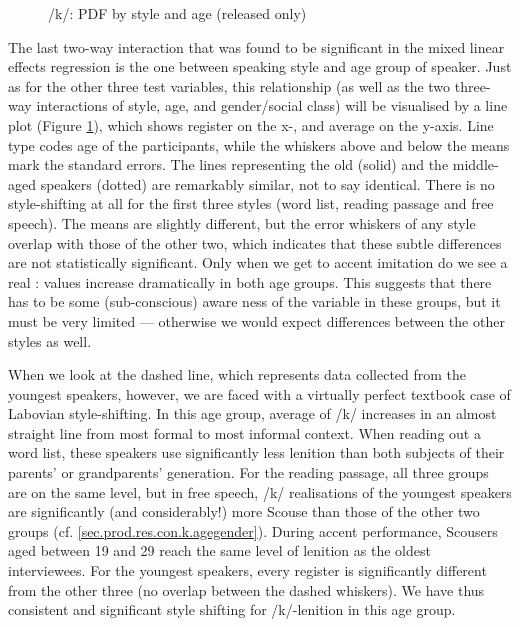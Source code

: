 \begin{figure}[h]
	\centering
		\resizebox{0.5\linewidth}{!}{} 
	\caption{/k/: PDF by style and age (released only)}
	\label{fig.line.k.tot}
\end{figure}

The last two-way interaction that was found to be significant in the mixed linear effects regression is the one between speaking style and age group of speaker.
Just as for the other three test variables, this relationship (as well as the two three-way interactions of style, age, and gender/social class) will be visualised by a line plot (Figure \ref{fig.line.k.tot}), which shows register on the x-, and average  on the y-axis.
Line type codes age of the participants, while the whiskers above and below the means mark the standard errors.
The lines representing the old (solid) and the middle-aged speakers (dotted) are remarkably similar, not to say identical.
There is no style-shifting at all for the first three styles (word list, reading passage and free speech).
The means are slightly different, but the error whiskers of any style overlap with those of the other two, which indicates that these subtle differences are not statistically significant.
Only when we get to accent imitation do we see a real :  values increase dramatically in both age groups.
This suggests that there has to be some (sub-conscious) aware ness of the variable in these groups, but it must be very limited --- otherwise we would expect differences between the other styles as well.

When we look at the dashed line, which represents data collected from the youngest speakers, however, we are faced with a virtually perfect textbook case of Labovian style-shifting.
In this age group, average  of /k/ increases in an almost straight line from most formal to most informal context.
When reading out a word list, these speakers use significantly less lenition than both subjects of their parents' or grandparents' generation.
For the reading passage, all three groups are on the same level, but in free speech, /k/ realisations of the youngest speakers are significantly (and considerably!) more Scouse than those of the other two groups (cf. \ref{sec.prod.res.con.k.agegender}).
During accent performance, Scousers aged between 19 and 29 reach the same level of lenition as the oldest interviewees.
For the youngest speakers, every register is significantly different from the other three (no overlap between the dashed whiskers).
We have thus consistent and significant style shifting for /k/-lenition in this age group.

